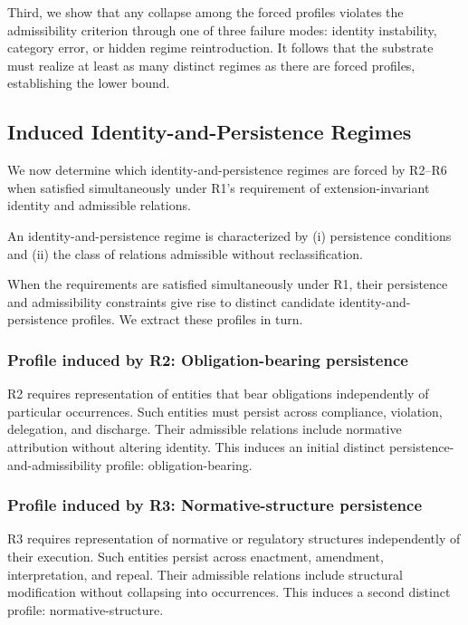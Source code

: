 Third, we show that any collapse among the forced profiles
violates the admissibility criterion through one of three failure modes:
identity instability, category error, or hidden regime reintroduction.
It follows that the substrate must realize at least as many distinct regimes
as there are forced profiles, establishing the lower bound.


\subsection{Induced Identity-and-Persistence Regimes}
\label{sec:regimes}

We now determine which identity-and-persistence regimes
are forced by R2--R6 when satisfied simultaneously
under R1's requirement of extension-invariant identity
and admissible relations.

An identity-and-persistence regime is characterized by
(i) persistence conditions and
(ii) the class of relations admissible without reclassification.

When the requirements are satisfied simultaneously under R1,
their persistence and admissibility constraints give rise to
distinct candidate identity-and-persistence profiles.
We extract these profiles in turn.

\subsubsection{Profile induced by R2: Obligation-bearing persistence}

R2 requires representation of entities that bear obligations independently of particular occurrences.
Such entities must persist across compliance, violation, delegation, and discharge.
Their admissible relations include normative attribution without altering identity.
This induces an initial distinct persistence-and-admissibility profile: obligation-bearing.

\subsubsection{Profile induced by R3: Normative-structure persistence}

R3 requires representation of normative or regulatory structures independently of their execution.
Such entities persist across enactment, amendment, interpretation, and repeal.
Their admissible relations include structural modification without collapsing into occurrences.
This induces a second distinct profile: normative-structure.

